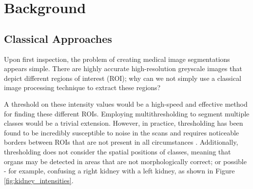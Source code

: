 \documentclass{l4proj}
\begin{document}
\chapter{Background} \label{chap:background}

\section{Classical Approaches} \label{sec:classical}

Upon first inspection, the problem of creating medical image segmentations appears simple. There are highly accurate high-resolution greyscale images that depict different regions of interest (ROI); why can we not simply use a classical image processing technique to extract these regions?

A threshold on these intensity values would be a high-speed and effective method for finding these different ROIs. Employing multithresholding to segment multiple classes would be a trivial extension. However, in practice, thresholding has been found to be incredibly susceptible to noise in the scans \citep{pham2000current, sharma2010automated, rogowska2000overview} and requires noticeable borders between ROIs that are not present in all circumstances \citep{patil2013medical}. Additionally, thresholding does not consider the spatial positions of classes, meaning that organs may be detected in areas that are not morphologically correct; or possible \citep{pham2000current} - for example, confusing a right kidney with a left kidney, as shown in Figure \ref{fig:kidney_intensities}.
\end{document}

